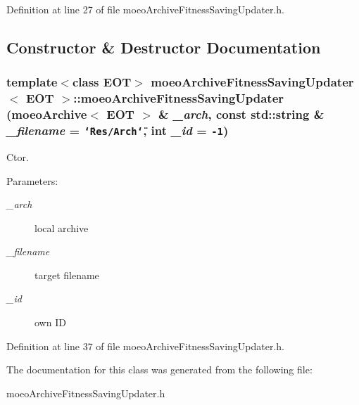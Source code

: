 Definition at line 27 of file moeo\-Archive\-Fitness\-Saving\-Updater.h.

\subsection{Constructor \& Destructor Documentation}
\subsubsection{\setlength{\rightskip}{0pt plus 5cm}template$<$class EOT$>$ {\bf moeo\-Archive\-Fitness\-Saving\-Updater}$<$ EOT $>$::{\bf moeo\-Archive\-Fitness\-Saving\-Updater} ({\bf moeo\-Archive}$<$ EOT $>$ \& {\em \_\-arch}, const std::string \& {\em \_\-filename} = {\tt \char`\"{}Res/Arch\char`\"{}}, int {\em \_\-id} = {\tt -1})\hspace{0.3cm}{\tt  [inline]}}\label{classmoeoArchiveFitnessSavingUpdater_b61826bfa0f47064aed460817cf61b92}


Ctor. 

\begin{Desc}
\item[Parameters:]
\begin{description}
\item[{\em \_\-arch}]local archive \item[{\em \_\-filename}]target filename \item[{\em \_\-id}]own ID \end{description}
\end{Desc}


Definition at line 37 of file moeo\-Archive\-Fitness\-Saving\-Updater.h.

The documentation for this class was generated from the following file:\begin{CompactItemize}
\item 
moeo\-Archive\-Fitness\-Saving\-Updater.h\end{CompactItemize}

